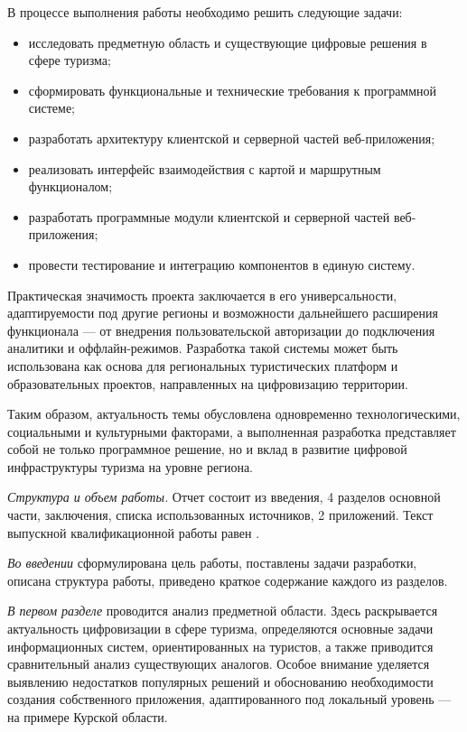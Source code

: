 В процессе выполнения работы необходимо решить следующие задачи:
\begin{itemize}
\item исследовать предметную область и существующие цифровые решения в сфере туризма;
\item сформировать функциональные и технические требования к программной системе;
\item разработать архитектуру клиентской и серверной частей веб-приложения;
\item реализовать интерфейс взаимодействия с картой и маршрутным функционалом;
\item разработать программные модули клиентской и серверной частей веб-приложения;
\item провести тестирование и интеграцию компонентов в единую систему.
\end{itemize}

Практическая значимость проекта заключается в его универсальности, адаптируемости под другие регионы и возможности дальнейшего расширения функционала — от внедрения пользовательской авторизации до подключения аналитики и оффлайн-режимов. Разработка такой системы может быть использована как основа для региональных туристических платформ и образовательных проектов, направленных на цифровизацию территории.

Таким образом, актуальность темы обусловлена одновременно технологическими, социальными и культурными факторами, а выполненная разработка представляет собой не только программное решение, но и вклад в развитие цифровой инфраструктуры туризма на уровне региона.

\emph{Структура и объем работы.} Отчет состоит из введения, 4 разделов основной части, заключения, списка использованных источников, 2 приложений. Текст выпускной квалификационной работы равен .

\emph{Во введении} сформулирована цель работы, поставлены задачи разработки, описана структура работы, приведено краткое содержание каждого из разделов.

\emph{В первом разделе} проводится анализ предметной области. Здесь раскрывается актуальность цифровизации в сфере туризма, определяются основные задачи информационных систем, ориентированных на туристов, а также приводится сравнительный анализ существующих аналогов. Особое внимание уделяется выявлению недостатков популярных решений и обоснованию необходимости создания собственного приложения, адаптированного под локальный уровень — на примере Курской области.

